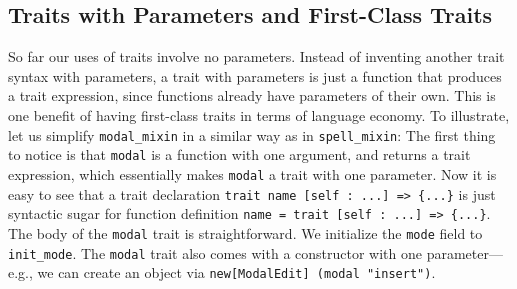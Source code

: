 


\begin{comment}
\paragraph{Mutually dependent traits} When two traits are composed, any two
methods in those two traits can refer to each other via the self-reference. We
say these two traits are \emph{mutually dependent}. The next example, though a
bit contrived, illustrates this point.

\noindent By utilizing trait requirements, the \lstinline{isEven} and
\lstinline{isOdd} methods can refer to each other in two different traits.
\end{comment}


\subsection{Traits with Parameters and First-Class Traits}\label{subsec:cons}

So far our uses of traits involve no parameters. Instead of inventing another trait
syntax with parameters, a trait with parameters is just a function that produces
a trait expression, since functions already have parameters of their own. This
is one benefit of having first-class traits in terms of language economy. To
illustrate, let us simplify \lstinline{modal_mixin} in a similar way as in \lstinline{spell_mixin}:
The first thing to notice is that \lstinline{modal} is a function with one
argument, and returns a trait expression, which essentially makes
\lstinline{modal} a trait with one parameter.
Now it is easy to see that a trait declaration
\lstinline$trait name [self : ...] => {...}$ is just syntactic sugar for
function definition \lstinline$name = trait [self : ...] => {...}$. The body of
the \lstinline{modal} trait is straightforward. We initialize the
\lstinline{mode} field to \lstinline{init_mode}.
The \lstinline{modal} trait also comes with a constructor with one parameter---e.g., we can create an object via \lstinline{new[ModalEdit] (modal "insert")}.


